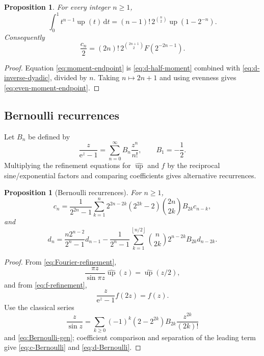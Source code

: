 \documentclass[11pt]{article}
\numberwithin{equation}{section}
\newtheorem{proposition}[theorem]{Proposition}
\theoremstyle{definition}
\theoremstyle{remark}
\newcommand{\upf}{\operatorname{up}}
\newcommand{\dd}{\,\mathrm d}
\newcommand{\e}{\mathrm e}
\newcommand{\floor}[1]{\left\lfloor#1\right\rfloor}
\begin{document}
\begin{proposition}\label{prop:moment-endpoint}
For every integer $n\ge1$,
\begin{equation}\label{eq:moment-endpoint}
 \int_0^1t^{n-1}\upf(t)\dd t
 =(n-1)!\,2^{\binom n2}\upf(1-2^{-n}).
\end{equation}
Consequently
\begin{equation}\label{eq:even-moment-endpoint}
 \frac{c_n}{2}=(2n)!\,2^{\binom{2n+1}{2}}F(2^{-2n-1}).
\end{equation}
\end{proposition}

\begin{proof}
Equation \eqref{eq:moment-endpoint} is \eqref{eq:d-half-moment} combined with \eqref{eq:d-inverse-dyadic}, divided by $n$.  Taking $n\mapsto2n+1$ and using evenness gives \eqref{eq:even-moment-endpoint}.
\end{proof}

\subsection{Bernoulli recurrences}

Let $B_n$ be defined by
\begin{equation}\label{eq:Bernoulli-gen}
 \frac{z}{\e^z-1}=\sum_{n=0}^{\infty}B_n\frac{z^n}{n!},
 \qquad B_1=-\frac12.
\end{equation}
Multiplying the refinement equations for $\widehat{\upf}$ and $f$ by the reciprocal sine/exponential factors and comparing coefficients gives alternative recurrences.

\begin{proposition}[Bernoulli recurrences]\label{prop:Bernoulli-recurrences}
For $n\ge1$,
\begin{equation}\label{eq:c-Bernoulli}
 c_n=\frac{1}{2^{2n}-1}\sum_{k=1}^{n}
 2^{2n-2k}(2^{2k}-2)\binom{2n}{2k}B_{2k}c_{n-k},
\end{equation}
and
\begin{equation}\label{eq:d-Bernoulli}
 d_n=\frac{n2^{n-2}}{2^n-1}d_{n-1}
 -\frac{1}{2^n-1}\sum_{k=1}^{\floor{n/2}}
 \binom n{2k}2^{n-2k}B_{2k}d_{n-2k}.
\end{equation}
\end{proposition}

\begin{proof}
From \eqref{eq:Fourier-refinement},
\[
 \frac{\pi z}{\sin\pi z}\widehat{\upf}(z)=\widehat{\upf}(z/2),
\]
and from \eqref{eq:f-refinement},
\[
 \frac{z}{\e^z-1}f(2z)=f(z).
\]
Use the classical series
\[
 \frac{z}{\sin z}=\sum_{k\ge0}(-1)^k(2-2^{2k})B_{2k}\frac{z^{2k}}{(2k)!}
\]
and \eqref{eq:Bernoulli-gen}; coefficient comparison and separation of the leading term give \eqref{eq:c-Bernoulli} and \eqref{eq:d-Bernoulli}.
\end{proof}
\end{document}

